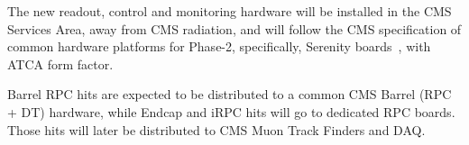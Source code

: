 The new readout, control and monitoring hardware will be installed in the CMS Services Area, away from CMS radiation, and will follow the CMS specification of common hardware platforms for Phase-2, specifically, Serenity boards~\cite{serenity}, with ATCA form factor. 



\begin{tcolorbox}[colback=gray!5,colframe=gray!40!black]
    Barrel RPC hits are expected to be distributed to a common CMS Barrel (RPC + DT) hardware, while Endcap and iRPC hits will go to dedicated RPC boards. Those hits will later be distributed to CMS Muon Track Finders and DAQ.
\end{tcolorbox}

